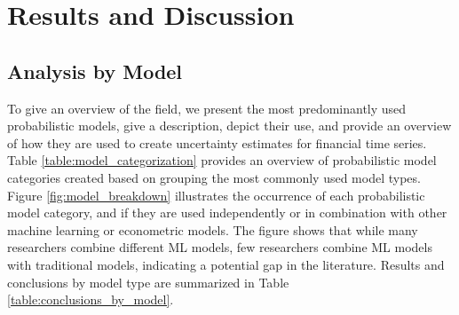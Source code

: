 \section{Results and Discussion}
\label{sec:result_and_discussion}


\subsection{Analysis by Model}
\label{sec:analysis_by_model}
To give an overview of the field, we present the most predominantly used probabilistic models, give a description, depict their use, and provide an overview of how they are used to create uncertainty estimates for financial time series. Table \ref{table:model_categorization} provides an overview of probabilistic model categories created based on grouping the most commonly used model types. Figure \ref{fig:model_breakdown} illustrates the occurrence of each probabilistic model category, and if they are used independently or in combination with other machine learning or econometric models. The figure shows that while many researchers combine different ML models, few researchers combine ML models with traditional models, indicating a potential gap in the literature. Results and conclusions by model type are summarized in Table \ref{table:conclusions_by_model}.

